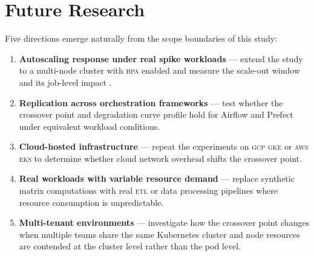 \section{Future Research}

Five directions emerge naturally from the scope boundaries of this study:

\begin{enumerate}
  \item \textbf{Autoscaling response under real spike workloads} --- extend the study to a
        multi-node cluster with \textsc{hpa} enabled and measure the scale-out window and
        its job-level impact \citep{tran2022, yuan2024}.
  \item \textbf{Replication across orchestration frameworks} --- test whether the crossover
        point and degradation curve profile hold for Airflow and Prefect under equivalent
        workload conditions.
  \item \textbf{Cloud-hosted infrastructure} --- repeat the experiments on \textsc{gcp}
        \textsc{gke} or \textsc{aws} \textsc{eks} to determine whether cloud network
        overhead shifts the crossover point.
  \item \textbf{Real workloads with variable resource demand} --- replace synthetic matrix
        computations with real \textsc{etl} or data processing pipelines where resource
        consumption is unpredictable.
  \item \textbf{Multi-tenant environments} --- investigate how the crossover point changes
        when multiple teams share the same Kubernetes cluster and node resources are
        contended at the cluster level rather than the pod level.
\end{enumerate}
